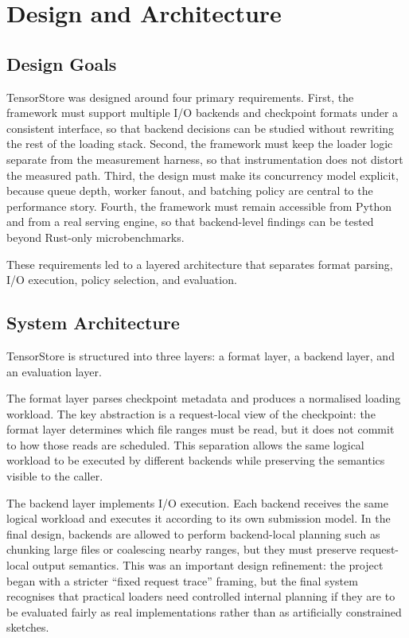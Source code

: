 \chapter{Design and Architecture}
\label{chap:design}

\section{Design Goals}

TensorStore was designed around four primary requirements. First, the framework must support multiple I/O backends and checkpoint formats under a consistent interface, so that backend decisions can be studied without rewriting the rest of the loading stack. Second, the framework must keep the loader logic separate from the measurement harness, so that instrumentation does not distort the measured path. Third, the design must make its concurrency model explicit, because queue depth, worker fanout, and batching policy are central to the performance story. Fourth, the framework must remain accessible from Python and from a real serving engine, so that backend-level findings can be tested beyond Rust-only microbenchmarks.

These requirements led to a layered architecture that separates format parsing, I/O execution, policy selection, and evaluation.

\section{System Architecture}

TensorStore is structured into three layers: a format layer, a backend layer, and an evaluation layer.

The format layer parses checkpoint metadata and produces a normalised loading workload. The key abstraction is a request-local view of the checkpoint: the format layer determines which file ranges must be read, but it does not commit to how those reads are scheduled. This separation allows the same logical workload to be executed by different backends while preserving the semantics visible to the caller.

The backend layer implements I/O execution. Each backend receives the same logical workload and executes it according to its own submission model. In the final design, backends are allowed to perform backend-local planning such as chunking large files or coalescing nearby ranges, but they must preserve request-local output semantics. This was an important design refinement: the project began with a stricter ``fixed request trace'' framing, but the final system recognises that practical loaders need controlled internal planning if they are to be evaluated fairly as real implementations rather than as artificially constrained sketches.

